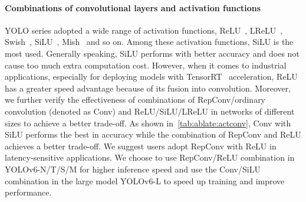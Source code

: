 \documentclass[10pt,twocolumn,letterpaper]{article}
\begin{document}
  \begin{table}[!thbp]
    \begin{center}
    \end{center}
    \caption{Ablation study on the neck settings of YOLOv6-L. SiLU is selected as the activation function.}
    \label{tab:ablate:neck}
  \end{table}

  \paragraph{Combinations of convolutional layers and activation functions}
 YOLO series adopted a wide range of activation functions, ReLU~\cite{nair2010rectified}, LReLU~\cite{maas2013rectifier}, Swish~\cite{ramachandran2017searching}, SiLU~\cite{elfwing2018sigmoid}, Mish~\cite{misra2019mish} and so on. Among these activation functions, SiLU is the most used. Generally speaking, SiLU performs with better accuracy and does not cause too much extra computation cost. However, when it comes to industrial applications, especially for deploying models with TensorRT~\cite{tensorrt} acceleration, ReLU has a greater speed advantage because of its fusion into convolution. 
 Moreover, we further verify the effectiveness of combinations of RepConv/ordinary convolution (denoted as Conv) and ReLU/SiLU/LReLU in networks of different sizes to achieve a better trade-off. As shown in~\cref{tab:ablate:actconv}, Conv with SiLU performs the best in accuracy while the combination of RepConv and ReLU achieves a better trade-off. We suggest users adopt RepConv with ReLU in latency-sensitive applications. We choose to use RepConv/ReLU combination in YOLOv6-N/T/S/M for higher inference speed and use the Conv/SiLU combination in the large model YOLOv6-L to speed up training and improve performance.
\end{document}

